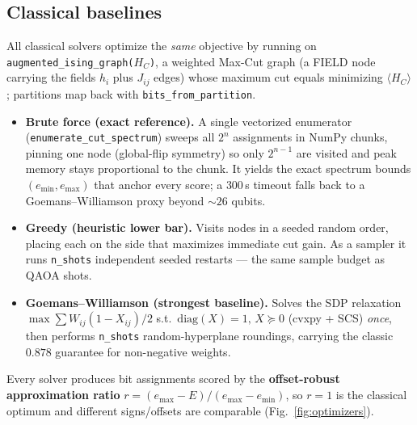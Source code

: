 \documentclass[10pt]{article}
\begin{document}
\subsection{Classical baselines}
All classical solvers optimize the \emph{same} objective by running on
\texttt{augmented\_ising\_graph($H_C$)}, a weighted Max-Cut graph (a FIELD node
carrying the fields $h_i$ plus $J_{ij}$ edges) whose maximum cut equals
minimizing $\langle H_C\rangle$; partitions map back with
\texttt{bits\_from\_partition}.
\begin{itemize}
  \item \textbf{Brute force (exact reference).} A single vectorized enumerator
        (\texttt{enumerate\_cut\_spectrum}) sweeps all $2^{n}$ assignments in
        NumPy chunks, pinning one node (global-flip symmetry) so only $2^{n-1}$
        are visited and peak memory stays proportional to the chunk. It yields
        the exact spectrum bounds $(e_{\min},e_{\max})$ that anchor every score;
        a $300$\,s timeout falls back to a Goemans--Williamson proxy beyond
        $\sim\!26$ qubits.
  \item \textbf{Greedy (heuristic lower bar).} Visits nodes in a seeded random
        order, placing each on the side that maximizes immediate cut gain.
        As a sampler it runs \texttt{n\_shots} independent seeded restarts ---
        the same sample budget as QAOA shots.
  \item \textbf{Goemans--Williamson (strongest baseline).} Solves the SDP
        relaxation $\max\sum W_{ij}(1-X_{ij})/2$ s.t.\ $\mathrm{diag}(X)=1,\,
        X\succeq0$ (cvxpy + SCS) \emph{once}, then performs \texttt{n\_shots}
        random-hyperplane roundings, carrying the classic $0.878$ guarantee for
        non-negative weights.
\end{itemize}
Every solver produces bit assignments scored by the \textbf{offset-robust
approximation ratio}
$r=(e_{\max}-E)/(e_{\max}-e_{\min})$, so $r=1$ is the classical optimum and
different signs/offsets are comparable (Fig.~\ref{fig:optimizers}).
\end{document}
